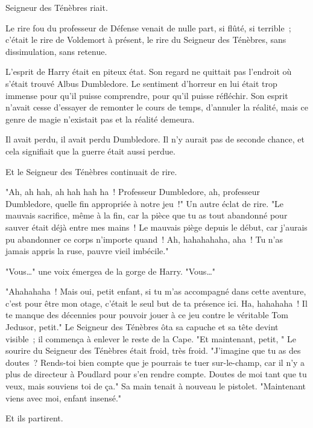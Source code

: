 
 Seigneur des Ténèbres riait.

\hplettrineextrapara
Le rire fou du professeur de Défense venait de nulle part, si flûté, si terrible~; c'était le rire de Voldemort à présent, le rire du Seigneur des Ténèbres, sans dissimulation, sans retenue.

L'esprit de Harry était en piteux état. Son regard ne quittait pas l'endroit où s'était trouvé Albus Dumbledore. Le sentiment d'horreur en lui était trop immense pour qu'il puisse comprendre, pour qu'il puisse réfléchir. Son esprit n'avait cesse d'essayer de remonter le cours de temps, d'annuler la réalité, mais ce genre de magie n'existait pas et la réalité demeura.

Il avait perdu, il avait perdu Dumbledore. Il n'y aurait pas de seconde chance, et cela signifiait que la guerre était aussi perdue.

Et le Seigneur des Ténèbres continuait de rire.

"Ah, ah hah, ah hah hah ha~! Professeur Dumbledore, ah, professeur Dumbledore, quelle fin appropriée à notre jeu~!" Un autre éclat de rire. "Le mauvais sacrifice, même à la fin, car la pièce que tu as tout abandonné pour sauver était déjà entre mes mains~! Le mauvais piège depuis le début, car j'aurais pu abandonner ce corps n'importe quand~! Ah, hahahahaha, aha~! Tu n'as jamais appris la ruse, pauvre vieil imbécile."

"Vous…" une voix émergea de la gorge de Harry. "Vous…"

"Ahahahaha~! Mais oui, petit enfant, si tu m'as accompagné dans cette aventure, c'est pour être mon otage, c'était le seul but de ta présence ici. Ha, hahahaha~! Il te manque des décennies pour pouvoir jouer à ce jeu contre le véritable Tom Jedusor, petit." Le Seigneur des Ténèbres ôta sa capuche et sa tête devint visible~; il commença à enlever le reste de la Cape. "Et maintenant, petit, " Le sourire du Seigneur des Ténèbres était froid, très froid. "J'imagine que tu as des doutes~? Rends-toi bien compte que je pourrais te tuer sur-le-champ, car il n'y a plus de directeur à Poudlard pour s'en rendre compte. Doutes de moi tant que tu veux, mais souviens toi de ça." Sa main tenait à nouveau le pistolet. "Maintenant viens avec moi, enfant insensé."

Et ils partirent.

